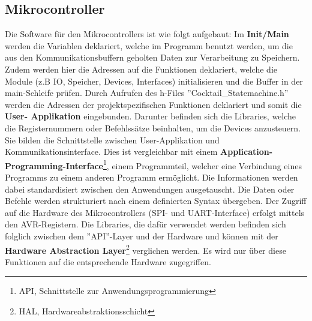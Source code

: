 \subsection{Mikrocontroller}
\label{subsec:Software_Atmega2560}

Die Software für den Mikrocontrollers ist wie folgt aufgebaut: 
Im \textbf{Init/Main} werden die Variablen deklariert, welche im Programm benutzt werden, um die aus den Kommunikationsbuffern geholten Daten zur Verarbeitung zu Speichern.
Zudem werden hier die Adressen auf die Funktionen deklariert, welche die Module (z.B IO, Speicher, Devices, Interfaces) initialisieren und die Buffer in der main-Schleife prüfen.
Durch Aufrufen des h-Files ''Cocktail\_Statemachine.h'' werden die Adressen der projektspezifischen Funktionen deklariert und somit die \textbf{User- Applikation} eingebunden. Darunter befinden sich die Libraries, welche die Registernummern oder Befehlssätze beinhalten, um die Devices anzusteuern.
Sie bilden die Schnittstelle zwischen User-Applikation und Kommunikationsinterface.
Dies ist vergleichbar mit einem \textbf{Application-Programming-Interface}\footnote{API, Schnittstelle zur Anwendungsprogrammierung}, einem Programmteil, welcher eine Verbindung eines Programms zu einem anderen Programm ermöglicht. 
Die Informationen werden dabei standardisiert zwischen den Anwendungen ausgetauscht.
Die Daten oder Befehle werden strukturiert nach einem definierten Syntax übergeben.
Der Zugriff auf die Hardware des Mikrocontrollers (SPI- und UART-Interface) erfolgt mittels den AVR-Registern.
Die Libraries, die dafür verwendet werden befinden sich folglich zwischen dem ''API''-Layer und der Hardware und können mit der \textbf{Hardware Abstraction Layer}\footnote{HAL, Hardwareabstraktionsschicht} verglichen werden.
Es wird nur über diese Funktionen auf die entsprechende Hardware zugegriffen. \cite{geisler_was_2018}